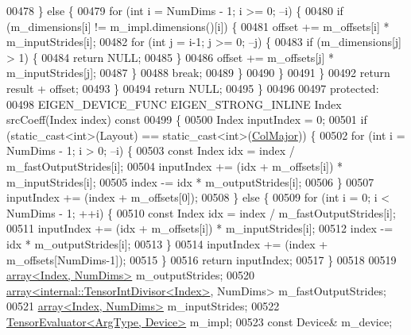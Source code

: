 \begin{DoxyCode}
00478       \} \textcolor{keywordflow}{else} \{
00479         \textcolor{keywordflow}{for} (\textcolor{keywordtype}{int} i = NumDims - 1; i >= 0; --i) \{
00480           \textcolor{keywordflow}{if} (m\_dimensions[i] != m\_impl.dimensions()[i]) \{
00481             offset += m\_offsets[i] * m\_inputStrides[i];
00482             \textcolor{keywordflow}{for} (\textcolor{keywordtype}{int} j = i-1; j >= 0; --j) \{
00483               \textcolor{keywordflow}{if} (m\_dimensions[j] > 1) \{
00484                 \textcolor{keywordflow}{return} NULL;
00485               \}
00486               offset += m\_offsets[j] * m\_inputStrides[j];
00487             \}
00488             \textcolor{keywordflow}{break};
00489           \}
00490         \}
00491       \}
00492       \textcolor{keywordflow}{return} result + offset;
00493     \}
00494     \textcolor{keywordflow}{return} NULL;
00495   \}
00496 
00497  \textcolor{keyword}{protected}:
00498   EIGEN\_DEVICE\_FUNC EIGEN\_STRONG\_INLINE Index srcCoeff(Index index)\textcolor{keyword}{ const}
00499 \textcolor{keyword}{  }\{
00500     Index inputIndex = 0;
00501     \textcolor{keywordflow}{if} (static\_cast<int>(Layout) == static\_cast<int>(\hyperlink{group__enums_ggaacded1a18ae58b0f554751f6cdf9eb13a0cbd4bdd0abcfc0224c5fcb5e4f6669a}{ColMajor})) \{
00502       \textcolor{keywordflow}{for} (\textcolor{keywordtype}{int} i = NumDims - 1; i > 0; --i) \{
00503         \textcolor{keyword}{const} Index idx = index / m\_fastOutputStrides[i];
00504         inputIndex += (idx + m\_offsets[i]) * m\_inputStrides[i];
00505         index -= idx * m\_outputStrides[i];
00506       \}
00507       inputIndex += (index + m\_offsets[0]);
00508     \} \textcolor{keywordflow}{else} \{
00509       \textcolor{keywordflow}{for} (\textcolor{keywordtype}{int} i = 0; i < NumDims - 1; ++i) \{
00510         \textcolor{keyword}{const} Index idx = index / m\_fastOutputStrides[i];
00511         inputIndex += (idx + m\_offsets[i]) * m\_inputStrides[i];
00512         index -= idx * m\_outputStrides[i];
00513       \}
00514       inputIndex += (index + m\_offsets[NumDims-1]);
00515     \}
00516     \textcolor{keywordflow}{return} inputIndex;
00517   \}
00518 
00519   \hyperlink{class_eigen_1_1array}{array<Index, NumDims>} m\_outputStrides;
00520   \hyperlink{class_eigen_1_1array}{array<internal::TensorIntDivisor<Index>}, NumDims> 
      m\_fastOutputStrides;
00521   \hyperlink{class_eigen_1_1array}{array<Index, NumDims>} m\_inputStrides;
00522   \hyperlink{struct_eigen_1_1_tensor_evaluator}{TensorEvaluator<ArgType, Device>} m\_impl;
00523   \textcolor{keyword}{const} Device& m\_device;

\end{DoxyCode}

